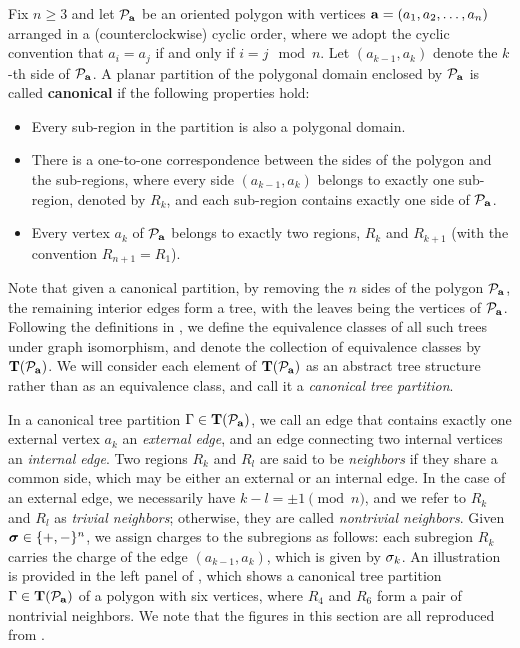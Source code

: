 \begin{definition}\label{def:canpnical_part}
Fix $n\ge 3$ and let $\mathcal P_{{\mathbf{a}}}$ be an oriented polygon with vertices ${\mathbf{a}}=(a_1,a_2, \ldots ,a_n)$ arranged in a (counterclockwise) cyclic order,  where we adopt the cyclic convention that $a_i=a_j$ if and only if $i=j\mod n$. Let $(a_{k-1},a_k)$ denote the $k$-th side of $\mathcal P_{{\mathbf{a}}}$. A planar partition of the polygonal domain enclosed by $\mathcal P_{{\mathbf{a}}}$ is called {\bf canonical} if the following properties hold:
\begin{itemize}
\item Every sub-region in the partition is also a polygonal domain. 
\item There is a one-to-one correspondence between the sides of the polygon and the sub-regions, where every side $(a_{k-1},a_k)$ belongs to exactly one sub-region, denoted by $R_k$, and each sub-region contains exactly one side of $\mathcal P_{{\mathbf{a}}}$. 

\item Every vertex $a_k$ of $\mathcal P_{{\mathbf{a}}}$ belongs to exactly two regions, $R_k$ and $R_{k+1}$ (with the convention $R_{n+1}=R_1$). 
  
\end{itemize}
Note that given a canonical partition, by removing the $n$ sides of the polygon ${\mathcal P}_{{\mathbf{a}}}$, the remaining interior edges form a tree, with the leaves being the vertices of ${\mathcal P}_{{\mathbf{a}}}$. Following the definitions in \cite{YY_25}, we define the equivalence classes of all such trees under graph isomorphism, and denote the collection of equivalence classes by $\operatorname{{\mathbf T}}({\mathcal P}_{{\mathbf{a}}})$. %
We will consider each element of $\operatorname{{\mathbf T}}({\mathcal P}_{{\mathbf{a}}})$ as an abstract tree structure rather than as an equivalence class, and call it a \emph{canonical tree partition}.
\end{definition}

In a canonical tree partition $\Gamma \in \operatorname{{\mathbf T}}({\mathcal P}_{{\mathbf{a}}})$, we call an edge that contains exactly one external vertex $a_k$ an \emph{external edge}, and an edge connecting two internal vertices an \emph{internal edge}. Two regions $R_k$ and $R_l$ are said to be \emph{neighbors} if they share a common side, which may be either an external or an internal edge. In the case of an external edge, we necessarily have $k-l = \pm 1 \pmod{n}$, and we refer to $R_k$ and $R_l$ as \emph{trivial neighbors}; otherwise, they are called \emph{nontrivial neighbors}.
Given ${\boldsymbol{\sigma}} \in \{+,-\}^n$, we assign charges to the subregions as follows: each subregion $R_k$ carries the charge of the edge $(a_{k-1},a_k)$, which is given by $\sigma_k$. An illustration is provided in the left panel of , which shows a canonical tree partition $\Gamma \in \operatorname{{\mathbf T}}({\mathcal P}_{{\mathbf{a}}})$ of a polygon with six vertices, where $R_4$ and $R_6$ form a pair of nontrivial neighbors. We note that the figures in this section are all reproduced from \cite{RBSO1D}.


